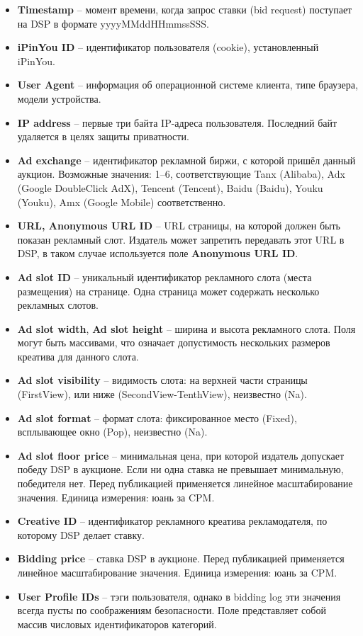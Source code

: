 \begin{itemize}
    \item \textbf{Timestamp} -- момент времени, когда запрос ставки (bid request) поступает на DSP в формате yyyyMMddHHmmssSSS.
    \item \textbf{iPinYou ID} -- идентификатор пользователя (cookie), установленный iPinYou.
    \item \textbf{User Agent} -- информация об операционной системе клиента, типе браузера, модели устройства.
    \item \textbf{IP address} -- первые три байта IP-адреса пользователя. Последний байт удаляется в целях защиты приватности.
    \item \textbf{Ad exchange} -- идентификатор рекламной биржи, с которой пришёл данный аукцион. Возможные значения: 1--6, соответствующие Tanx (Alibaba), Adx (Google DoubleClick AdX), Tencent (Tencent), Baidu (Baidu), Youku (Youku), Amx (Google Mobile) соответственно.
    \item \textbf{URL, Anonymous URL ID} -- URL страницы, на которой должен быть показан рекламный слот. Издатель может запретить передавать этот URL в DSP, в таком случае используется поле \textbf{Anonymous URL ID}. 
    \item \textbf{Ad slot ID} -- уникальный идентификатор рекламного слота (места размещения) на странице. Одна страница может содержать несколько рекламных слотов.
    \item \textbf{Ad slot width}, \textbf{Ad slot height} -- ширина и высота рекламного слота. Поля могут быть массивами, что означает допустимость нескольких размеров креатива для данного слота.
    \item \textbf{Ad slot visibility} -- видимость слота: на верхней части страницы (FirstView), или ниже (SecondView-TenthView), неизвестно (Na).
    \item \textbf{Ad slot format} -- формат слота: фиксированное место (Fixed), всплывающее окно (Pop), неизвестно (Na).
    \item \textbf{Ad slot floor price} -- минимальная цена, при которой издатель допускает победу DSP в аукционе. Если ни одна ставка не превышает минимальную, победителя нет. Перед публикацией применяется линейное масштабирование значения. Единица измерения: юань за CPM.
    \item \textbf{Creative ID} -- идентификатор рекламного креатива рекламодателя, по которому DSP делает ставку.
    \item \textbf{Bidding price} -- ставка DSP в аукционе. Перед публикацией применяется линейное масштабирование значения. Единица измерения: юань за CPM.
    \item \textbf{User Profile IDs} -- тэги пользователя, однако в bidding log эти значения всегда пусты по соображениям безопасности. Поле представляет собой массив числовых идентификаторов категорий.
\end{itemize}

